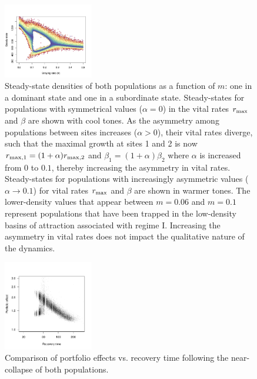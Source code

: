\documentclass{revtex4}
\begin{document}
\begin{figure}
  \captionsetup{justification=raggedright,
singlelinecheck=false
}
\centering
\includegraphics[width=0.35\textwidth]{fig_density.png}
\caption{
Steady-state densities of both populations as a function of $m$: one in a dominant state and one in a subordinate state.
Steady-states for populations with symmetrical values ($\alpha=0$) in the vital rates $r_{\rm max}$ and $\beta$ are shown with cool tones.
As the asymmetry among populations between sites increases ($\alpha>0$), their vital rates diverge, such that the maximal growth at sites 1 and 2 is now $r_{\rm max,1}=(1 + \alpha)r_{\rm max,2}$ and $\beta_1=(1+\alpha)\beta_2$ where $\alpha$ is increased from $0$ to $0.1$, thereby increasing the asymmetry in vital rates.
Steady-states for populations with increasingly asymmetric values ($\alpha\rightarrow 0.1$) for vital rates $r_{\rm max}$ and $\beta$ are shown in warmer tones.
The lower-density values that appear between $m=0.06$ and $m=0.1$ represent populations that have been trapped in the low-density basins of attraction associated with regime I.
Increasing the asymmetry in vital rates does not impact the qualitative nature of the dynamics.
} \label{fig:symmetry}
\end{figure}




\begin{figure}
  \captionsetup{justification=raggedright,
singlelinecheck=false
}
\centering
\includegraphics[width=0.35\textwidth]{fig_pevsrt.pdf}
\caption{
Comparison of portfolio effects vs. recovery time following the near-collapse of both populations.
} \label{fig:pevsrt}
\end{figure}
\end{document}
